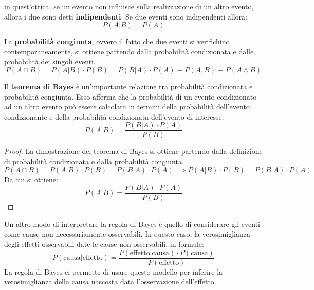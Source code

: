 in quest'ottica, se un evento non influisce sulla realizzazione di un altro
evento, allora i due sono detti \textbf{indipendenti}. Se due eventi sono
indipendenti allora:
\begin{equation}
    P(A | B) = P(A)
\end{equation}
\begin{definizione}
    La \textbf{probabilità congiunta}, ovvero il fatto che due eventi si
    verifichino contemporaneamente, si ottiene partendo dalla probabilità
    condizionata e dalle probabilità dei singoli eventi.
    \begin{equation}
        P(A \cap B) = P(A|B) \cdot P(B) = P(B|A) \cdot P(A) \equiv P(A, B) \equiv P(A \land B)
    \end{equation}
\end{definizione}
\begin{definizione}
    Il \textbf{teorema di Bayes} è un'importante relazione tra probabilità
    condizionata e probabilità congiunta. Esso afferma che la probabilità di
    un evento condizionato ad un altro evento può essere calcolata in termini
    della probabilità dell'evento condizionante e della probabilità
    condizionata dell'evento di interesse.
    \begin{equation}
        P(A|B) = \frac{P(B|A) \cdot P(A)}{P(B)}
    \end{equation}
    \begin{proof}
        La dimostrazione del teorema di Bayes si ottiene partendo dalla
        definizione di probabilità condizionata e dalla probabilità congiunta.
        \begin{equation*}
            P(A \cap B) = P(A|B) \cdot P(B) = P(B|A) \cdot P(A) \implies  P(A|B) \cdot P(B) = P(B|A) \cdot P(A)
        \end{equation*}
        Da cui si ottiene:
        \begin{equation*}
            P(A|B) = \frac{P(B|A) \cdot P(A)}{P(B)}
        \end{equation*}
    \end{proof}
\end{definizione}
Un altro modo di interpretare la regola di Bayes è quello di considerare
gli eventi come cause non necessariamente osservabili. In questo caso, la
verosimiglianza degli effetti osservabili date le cause non osservabili, in
formule:
\begin{equation*}
    P(\text{causa}|\text{effetto}) = \frac{P(\text{effetto}|\text{causa}) \cdot
        P(\text{causa})}{P(\text{effetto})}
\end{equation*}
La regola di Bayes ci permette di usare questo modello per inferire la
verosimiglianza della causa nascosta data l'osservazione dell'effetto.

